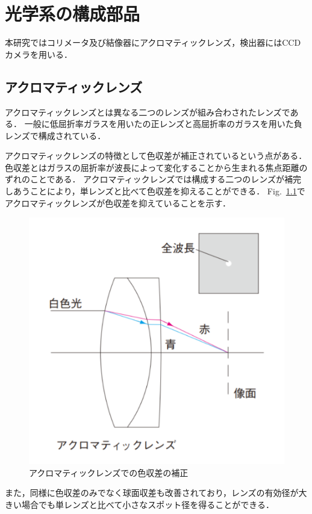 \chapter{光学系の構成部品}
本研究ではコリメータ及び結像器にアクロマティックレンズ，検出器にはCCDカメラを用いる．

\section{アクロマティックレンズ}
アクロマティックレンズとは異なる二つのレンズが組み合わされたレンズである．
一般に低屈折率ガラスを用いたの正レンズと高屈折率のガラスを用いた負レンズで構成されている．

アクロマティックレンズの特徴として色収差が補正されているという点がある．
色収差とはガラスの屈折率が波長によって変化することから生まれる焦点距離のずれのことである．
アクロマティックレンズでは構成する二つのレンズが補完しあうことにより，単レンズと比べて色収差を抑えることができる．
Fig.\ \ref{fig:achromaticlense}でアクロマティックレンズが色収差を抑えていることを示す．
\begin{figure}[htbp]
    \centering
    \includegraphics[scale=0.6]{figure/achromaticlense.pdf}
    \caption{アクロマティックレンズでの色収差の補正\cite{achromatic_lens}}
    \label{fig:achromaticlense}
\end{figure}
また，同様に色収差のみでなく球面収差も改善されており，レンズの有効径が大きい場合でも単レンズと比べて小さなスポット径を得ることができる．







